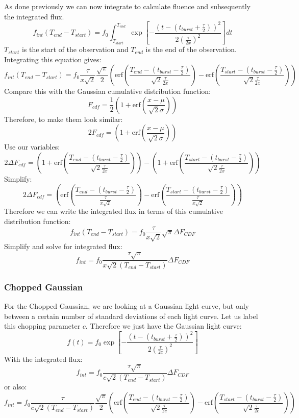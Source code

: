 \documentclass{article}
\begin{document}
As done previously we can now integrate to calculate fluence and subsequently the integrated flux. 
\[f_{int}(T_{end}-T_{start}) = f_0 \int_{T_{start}}^{T_{end}} \exp[-\frac{(t-(t_{burst}+\frac{\tau}{2}))^2}{2(\frac{\tau}{2x})^2}]dt\]
$T_{start}$ is the start of the observation and $T_{end}$ is the end of the observation. Integrating this equation gives:
\[f_{int}(T_{end}-T_{start}) = f_0 \frac{\tau}{x\sqrt{2}}\frac{\sqrt{\pi}}{2}(\text{erf}(\frac{T_{end}-(t_{burst}-\frac{\tau}{2})}{\sqrt{2}\frac{\tau}{2x}})-\text{erf}(\frac{T_{start}-(t_{burst}-\frac{\tau}{2})}{\sqrt{2}\frac{\tau}{2x}}))\]
Compare this with the Gaussian cumulative distribution function:
\[F_{cdf}=\frac{1}{2}(1+\text{erf}(\frac{x-\mu}{\sqrt{2}\sigma}))\]
Therefore, to make them look similar:
\[2F_{cdf}=(1+\text{erf}(\frac{x-\mu}{\sqrt{2}\sigma}))\]
Use our variables:
\[2\Delta F_{cdf}=(1+\text{erf}(\frac{T_{end}-(t_{burst}-\frac{\tau}{2})}{\sqrt{2}\frac{\tau}{2x}}))-(1+\text{erf}(\frac{T_{start}-(t_{burst}-\frac{\tau}{2})}{\sqrt{2}\frac{\tau}{2x}}))\]
Simplify:
\[2\Delta F_{cdf}=(\text{erf}(\frac{T_{end}-(t_{burst}-\frac{\tau}{2})}{\frac{\tau}{x\sqrt{2}}}) - \text{erf}(\frac{T_{start}-(t_{burst}-\frac{\tau}{2})}{\frac{\tau}{x\sqrt{2}}}))\]
Therefore we can write the integrated flux in terms of this cumulative distribution function:
\[f_{int}(T_{end}-T_{start}) = f_0 \frac{\tau}{x\sqrt{2}}\sqrt{\pi}\Delta F_{CDF}\]
Simplify and solve for integrated flux:
\[f_{int} = f_0 \frac{\tau\sqrt{\pi}}{x\sqrt{2}(T_{end}-T_{start})}\Delta F_{CDF}\]
\subsubsection{Chopped Gaussian}
For the Chopped Gaussian, we are looking at a Gaussian light curve, but only between a certain number of standard deviations of each light curve. Let us label this chopping parameter $c$.
Therefore we just have the Gaussian light curve:
\[f(t) = f_0  \exp[-\frac{(t-(t_{burst}+\frac{\tau}{2}))^2}{2(\frac{\tau}{2c})^2}]\]
With the integrated flux:
\[f_{int} = f_0 \frac{\tau\sqrt{\pi}}{c\sqrt{2}(T_{end}-T_{start})}\Delta F_{CDF}\]
or also:
\[f_{int} = f_0 \frac{\tau}{c\sqrt{2}(T_{end}-T_{start})}\frac{\sqrt{\pi}}{2}(\text{erf}(\frac{T_{end}-(t_{burst}-\frac{\tau}{2})}{\sqrt{2}\frac{\tau}{2c}})-\text{erf}(\frac{T_{start}-(t_{burst}-\frac{\tau}{2})}{\sqrt{2}\frac{\tau}{2c}}))\]
\end{document}
